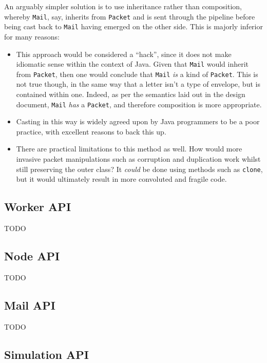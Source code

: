 An arguably simpler solution is to use inheritance rather than composition, whereby \texttt{Mail}, say, inherits from
\texttt{Packet} and is sent through the pipeline before being cast back to \texttt{Mail} having emerged on the other
side. This is majorly inferior for many reasons:
\begin{itemize}
    \item This approach would be considered a ``hack'', since it does not make idiomatic sense within the context of
    Java. Given that \texttt{Mail} would inherit from \texttt{Packet}, then one would conclude that \texttt{Mail}
    \emph{is} a kind of \texttt{Packet}. This is not true though, in the same way that a letter isn't a type of
    envelope, but is contained within one. Indeed, as per the semantics laid out in the design document,
    \texttt{Mail} \emph{has} a \texttt{Packet}, and therefore composition is more appropriate.
    \item Casting in this way is widely agreed upon by Java programmers to be a poor practice, with excellent reasons
    to back this up\cite{reddit_casting, yegor_bugayenko_casting, mark_casting, dennis_sosnoski_casting,
        erik_dietrich_casting}.
    \item There are practical limitations to this method as well. How would more invasive packet manipulations such
    as corruption and duplication work whilst still preserving the outer class? It \emph{could} be done using
    methods such as \texttt{clone}\cite{java_clone}, but it would ultimately result in more convoluted and fragile
    code\cite{java_avoid_clone}.
\end{itemize}

\subsection{Worker API}

TODO

\subsection{Node API}

TODO

\subsection{Mail API}

TODO

\subsection{Simulation API}

